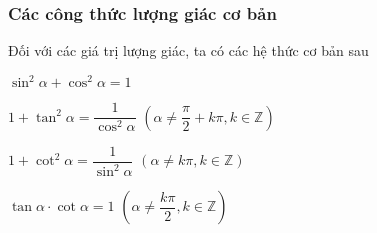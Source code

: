 \begin{tomtat}
	\subsubsection{Các công thức lượng giác cơ bản}
	Đối với các giá trị lượng giác, ta có các hệ thức cơ bản sau
	\begin{enumEX}[$\bullet$]{2}
		\item $\sin^2 \alpha  + \cos^2 \alpha =1$
		\item $ 1+ \tan^2 \alpha= \dfrac{1}{\cos^2 \alpha}$ $\left(\alpha \neq \dfrac{\pi}{2}+k\pi , k\in \mathbb{Z}\right)$
		\item $ 1+ \cot^2 \alpha= \dfrac{1}{\sin^2 \alpha}$ $\left(\alpha \neq k\pi , k\in \mathbb{Z}\right)$
		\item $\tan \alpha \cdot \cot \alpha =1 $ $\left(\alpha \neq \dfrac{k\pi}{2}, k\in \mathbb{Z}\right)$
	\end{enumEX}
	\newpage

\end{tomtat}
